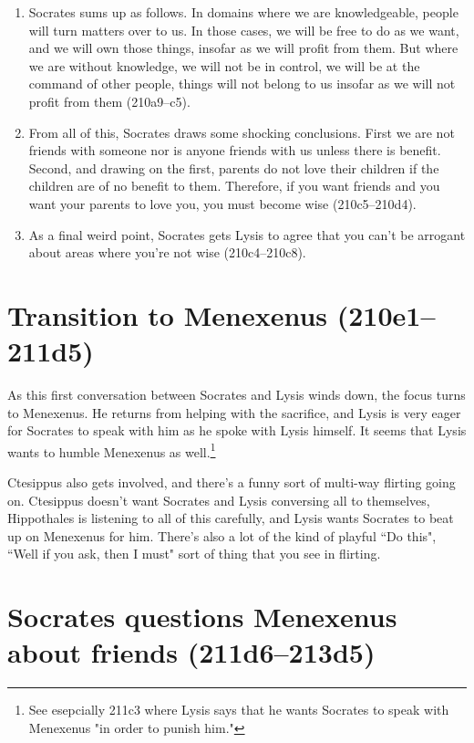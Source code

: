 \documentclass[11pt]{article}
\begin{document}
\begin{enumerate}
    \item Socrates sums up as follows.  In domains where we are knowledgeable, people will turn matters over to us.  In those cases, we will be free to do as we want, and we will own those things, insofar as we will profit from them.  But where we are without knowledge, we will not be in control, we will be at the command of other people, things will not belong to us insofar as we will not profit from them (210a9--c5).
    \item From all of this, Socrates draws some shocking conclusions.  First we are not friends with someone nor is anyone friends with us unless there is benefit.  Second, and drawing on the first, parents do not love their children if the children are of no benefit to them.  Therefore, if you want friends and you want your parents to love you, you must become wise (210c5--210d4).
    \item As a final weird point, Socrates gets Lysis to agree that you can't be arrogant about areas where you're not wise (210c4--210c8).
\end{enumerate}


\section{Transition to Menexenus (210e1--211d5)}

As this first conversation between Socrates and Lysis winds down, the focus turns to Menexenus.  He returns from helping with the sacrifice, and Lysis is very eager for Socrates to speak with him as he spoke with Lysis himself.  It seems that Lysis wants to humble Menexenus as well.\footnote{See esepcially 211c3 where Lysis says that he wants Socrates to speak with Menexenus "in order to punish him."}

Ctesippus also gets involved, and there's a funny sort of multi-way flirting going on.  Ctesippus doesn't want Socrates and Lysis conversing all to themselves, Hippothales is listening to all of this carefully, and Lysis wants Socrates to beat up on Menexenus for him.  There's also a lot of the kind of playful ``Do this", ``Well if you ask, then I must" sort of thing that you see in flirting.


\section{Socrates questions Menexenus about friends (211d6--213d5)}
\end{document}
